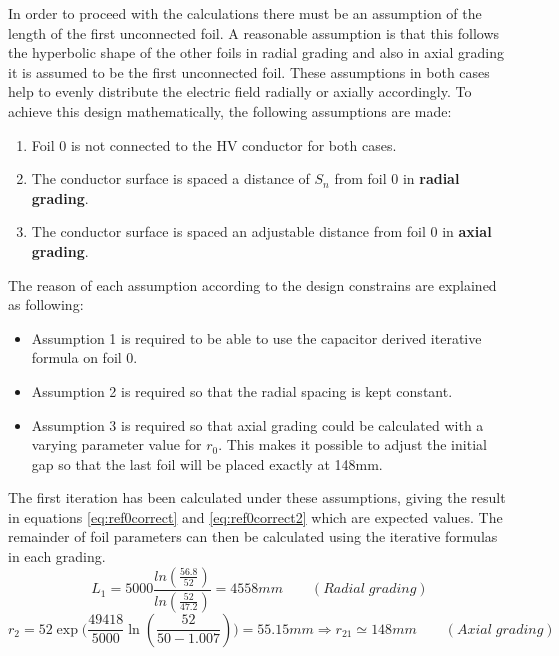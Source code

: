 In order to proceed with the calculations there must be an assumption of the length of the first unconnected foil.
A reasonable assumption is that this follows the hyperbolic shape of the other foils in radial grading and also in axial grading  it is assumed to be the first unconnected foil. These assumptions in both cases help to evenly distribute the electric field radially or axially accordingly.
To achieve this design mathematically, the following assumptions are made:
\begin{enumerate}
\item Foil $0$ is not connected to the HV conductor for both cases.
\item The conductor surface is spaced a distance of $S_n$ from foil $0$ in \textbf{radial grading}.
\item The conductor surface is spaced an adjustable distance from foil $0$ in \textbf{axial grading}.
\end{enumerate}
The reason of each assumption  according to the design constrains are explained as following:
\begin{itemize}[noitemsep,topsep=0pt]
\item Assumption 1 is required to be able to use the capacitor derived iterative formula on foil 0.
\item Assumption 2 is required so that the radial spacing is kept constant. 
\item Assumption 3 is required so that axial grading could be calculated with a varying parameter value for $r_0$. This makes it possible to adjust the initial gap so that the last foil will be placed exactly at 148mm. 

\end{itemize}
The first iteration has been calculated under these assumptions, giving the result in equations \ref{eq:ref0correct} and \ref{eq:ref0correct2} which are expected values.
The remainder of foil parameters can then be calculated using the iterative formulas in each grading.
\begin{equation}
   \label{eq:ref0correct}
   L_{1}
   = 5000\displaystyle\frac{{ln(\displaystyle\frac{56.8}{52})} }{ln(\displaystyle\frac{52}{47.2})}
   = 4558mm \qquad (Radial \; grading)
\end{equation}
\begin{equation}
\label{eq:ref0correct2}
   r_2 = 52 \exp\big( \frac{49418}{5000} \ln(\frac{52}{50-1.007})\big)= 55.15mm \Longrightarrow r_{21}\simeq 148mm \qquad (Axial \; grading)
\end{equation}



